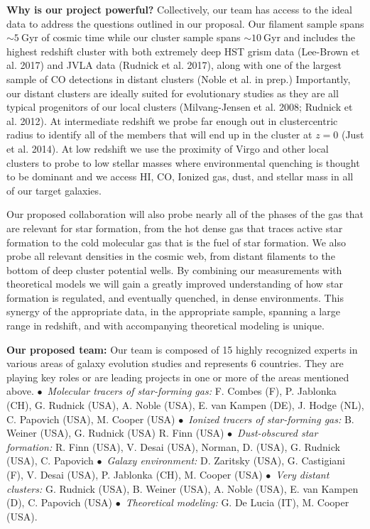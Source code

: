 \documentclass[11pt]{article}
\begin{document}
\textbf{Why is our project powerful?}   Collectively, our team has
access to the ideal data to address the questions outlined in our
proposal.  Our filament sample spans $\sim 5~$Gyr of cosmic time while our cluster sample spans $\sim10~$Gyr and
includes the highest redshift cluster with both extremely deep HST
grism data (Lee-Brown et al. 2017) and JVLA data (Rudnick et al. 2017), along with one of the largest sample of CO detections in distant clusters (Noble et al. in prep.)  Importantly, our distant clusters are ideally
suited for evolutionary studies as they are all typical progenitors of
our local clusters (Milvang-Jensen et al. 2008; Rudnick et al. 2012).
At intermediate redshift we probe far enough out in clustercentric
radius to identify all of the members that will end up in the cluster
at $z=0$ (Just et al. 2014).  At low redshift we use the proximity of Virgo and other local clusters to probe to low stellar masses where environmental quenching is thought to be dominant and we access HI, CO, Ionized gas, dust, and stellar mass in all of our target galaxies. 

Our proposed collaboration will also probe nearly all of the phases of
the gas that are relevant for star formation, from the hot dense gas
that traces active star formation to the cold molecular gas that is
the fuel of star formation.  We also probe all relevant densities in the cosmic web, from distant filaments to the bottom of deep cluster potential wells.  By combining our measurements with
theoretical models we will gain a greatly improved understanding of
how star formation is regulated, and eventually quenched, in dense
environments.  This synergy of the appropriate data, in the
appropriate sample, spanning a large range in redshift, and with
accompanying theoretical modeling is unique.


\textbf{Our proposed team:} Our team is composed of 15 highly
recognized experts in various areas of galaxy evolution studies and
represents 6 countries.  They are playing key roles or are leading
projects in one or more of the areas mentioned
above. $\bullet$~\textit{Molecular tracers of star-forming gas:}
F. Combes (F), P. Jablonka (CH), G. Rudnick (USA),
A. Noble (USA), E. van Kampen (DE), J. Hodge (NL), C. Papovich (USA), M. Cooper (USA) $\bullet$~\textit{Ionized tracers of star-forming gas:}
B. Weiner (USA), G. Rudnick (USA)
R. Finn (USA) $\bullet$~\textit{Dust-obscured star formation:} R. Finn
(USA), V. Desai (USA), Norman, D. (USA), G. Rudnick (USA), C. Papovich
$\bullet$~\textit{Galaxy environment:} D. Zaritsky (USA), G. Castigiani (F), V. Desai (USA), P. Jablonka (CH), M. Cooper (USA)
$\bullet$~\textit{Very distant clusters:} G. Rudnick (USA), B. Weiner
(USA), A. Noble (USA), E. van Kampen (D), C. Papovich (USA) $\bullet$~\textit{Theoretical modeling:} G. De
Lucia (IT), M. Cooper (USA).  
\end{document}
